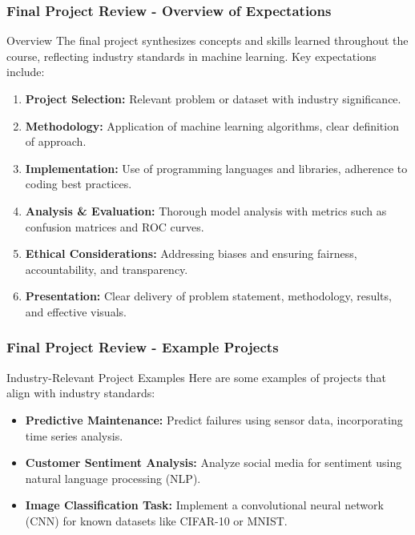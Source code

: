 \documentclass{beamer}
\begin{document}
\begin{frame}[fragile]
    \frametitle{Final Project Review - Overview of Expectations}
    \begin{block}{Overview}
        The final project synthesizes concepts and skills learned throughout the course, reflecting industry standards in machine learning. Key expectations include:
    \end{block}
    \begin{enumerate}
        \item \textbf{Project Selection:} Relevant problem or dataset with industry significance.
        \item \textbf{Methodology:} Application of machine learning algorithms, clear definition of approach.
        \item \textbf{Implementation:} Use of programming languages and libraries, adherence to coding best practices.
        \item \textbf{Analysis \& Evaluation:} Thorough model analysis with metrics such as confusion matrices and ROC curves.
        \item \textbf{Ethical Considerations:} Addressing biases and ensuring fairness, accountability, and transparency.
        \item \textbf{Presentation:} Clear delivery of problem statement, methodology, results, and effective visuals.
    \end{enumerate}
\end{frame}

\begin{frame}[fragile]
    \frametitle{Final Project Review - Example Projects}
    \begin{block}{Industry-Relevant Project Examples}
        Here are some examples of projects that align with industry standards:
    \end{block}
    \begin{itemize}
        \item \textbf{Predictive Maintenance:} Predict failures using sensor data, incorporating time series analysis.
        \item \textbf{Customer Sentiment Analysis:} Analyze social media for sentiment using natural language processing (NLP).
        \item \textbf{Image Classification Task:} Implement a convolutional neural network (CNN) for known datasets like CIFAR-10 or MNIST.
    \end{itemize}
\end{frame}
\end{document}
